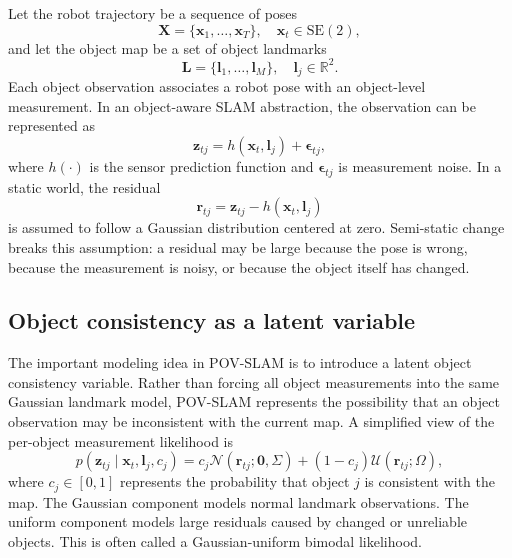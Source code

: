 ﻿\documentclass[11pt]{article}
\newcommand{\SEtwo}{\mathrm{SE}(2)}
\newcommand{\Rtwo}{\mathbb{R}^{2}}
\newcommand{\Normal}{\mathcal{N}}
\newcommand{\Uniform}{\mathcal{U}}
\begin{document}
Let the robot trajectory be a sequence of poses
\begin{equation}
    \mathbf{X} = \{\mathbf{x}_1, \ldots, \mathbf{x}_T\}, \quad \mathbf{x}_t \in \SEtwo,
\end{equation}
and let the object map be a set of object landmarks
\begin{equation}
    \mathbf{L} = \{\mathbf{l}_1, \ldots, \mathbf{l}_M\}, \quad \mathbf{l}_j \in \Rtwo.
\end{equation}
Each object observation associates a robot pose with an object-level measurement. In an object-aware SLAM abstraction, the observation can be represented as
\begin{equation}
    \mathbf{z}_{tj} = h(\mathbf{x}_t, \mathbf{l}_j) + \bm{\epsilon}_{tj},
\end{equation}
where $h(\cdot)$ is the sensor prediction function and $\bm{\epsilon}_{tj}$ is measurement noise. In a static world, the residual
\begin{equation}
    \mathbf{r}_{tj} = \mathbf{z}_{tj} - h(\mathbf{x}_t, \mathbf{l}_j)
\end{equation}
is assumed to follow a Gaussian distribution centered at zero. Semi-static change breaks this assumption: a residual may be large because the pose is wrong, because the measurement is noisy, or because the object itself has changed.

\subsection{Object consistency as a latent variable}
The important modeling idea in POV-SLAM is to introduce a latent object consistency variable. Rather than forcing all object measurements into the same Gaussian landmark model, POV-SLAM represents the possibility that an object observation may be inconsistent with the current map. A simplified view of the per-object measurement likelihood is
\begin{equation}
    p(\mathbf{z}_{tj} \mid \mathbf{x}_t, \mathbf{l}_j, c_j)
    = c_j \Normal(\mathbf{r}_{tj}; \mathbf{0}, \Sigma)
    + (1-c_j) \Uniform(\mathbf{r}_{tj}; \Omega),
    \label{eq:pov_mixture}
\end{equation}
where $c_j \in [0,1]$ represents the probability that object $j$ is consistent with the map. The Gaussian component models normal landmark observations. The uniform component models large residuals caused by changed or unreliable objects. This is often called a Gaussian-uniform bimodal likelihood.
\end{document}
